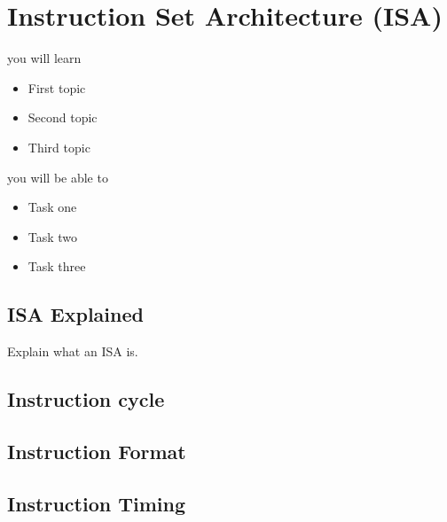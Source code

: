 \setchapterpreamble[u]{\margintoc}
\chapter{Instruction Set Architecture (ISA)}

%
\begin{kaobox}[frametitle=In This Chapter]
you will learn
\begin{itemize}
	\item First topic
	\item Second topic
        \item Third topic
\end{itemize}

you will be able to
\begin{itemize}
        \item Task one
        \item Task two
        \item Task three
\end{itemize}
\end{kaobox}

\blindtext

%
\section{ISA Explained}
Explain what an ISA is.

%
\section{Instruction cycle}
\blindtext

%
\section{Instruction Format}

%
\section{Instruction Timing}
\blindtext

